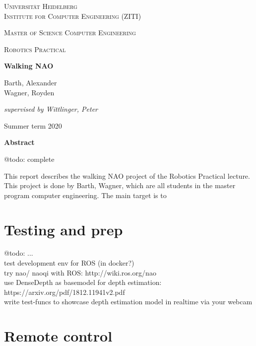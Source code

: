 \documentclass[12pt]{article}
\newcommand{\lecture}{Robotics Practical}
\newcommand{\nao}{NAO} %
\newcommand{\project}{Walking \nao}
\newcommand{\groupmembersshort}{Barth, Wagner}
\newcommand{\groupmemberslist}{Barth, Alexander\\Wagner, Royden}
\newcommand{\semester}{Summer term 2020}
\newcommand{\supervisor}{Wittlinger, Peter}
\begin{document}
	\begin{titlepage}
		\centering
		
		{\scshape\LARGE Universität Heidelberg\\Institute for Computer Engineering (ZITI) \par}
		\vspace{1.5cm}
		{\scshape\Large Master of Science Computer Engineering \par}
		\vspace{0.5cm}
		{\scshape\Large \lecture \par}
		\vspace{1.5cm}
		{\huge\bfseries \project \par}
		\vspace{2cm}
		{\large \groupmemberslist \par}
		\vspace{2cm}
		{\itshape supervised by \supervisor \par}
		\vfill
		
		
		{\large \semester \par}
	\end{titlepage}

\noindent \textbf{Abstract}

@todo: complete

This report describes the walking \nao{} project of the \lecture{} lecture.
This project is done by \groupmembersshort, which are all students in the master program computer engineering.
The main target is to

\tableofcontents
\newpage

\section{Testing and prep}

@todo: ...\\

test development env for ROS (in docker?)\\
try nao/ naoqi with ROS: http://wiki.ros.org/nao\\
use DenseDepth as basemodel for depth estimation: https://arxiv.org/pdf/1812.11941v2.pdf\\
write test-funcs to showcase depth estimation model in realtime via your webcam

\section{Remote control}
\end{document}

